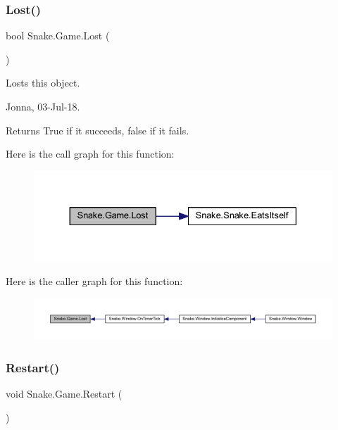 \subsubsection{\texorpdfstring{Lost()}{Lost()}}
{\footnotesize\ttfamily bool Snake.\+Game.\+Lost (\begin{DoxyParamCaption}{ }\end{DoxyParamCaption})}



Losts this object. 

Jonna, 03-\/\+Jul-\/18. 

\begin{DoxyReturn}{Returns}
True if it succeeds, false if it fails. 
\end{DoxyReturn}
Here is the call graph for this function\+:
\nopagebreak
\begin{figure}[H]
\begin{center}
\leavevmode
\includegraphics[width=330pt]{d5/d72/class_snake_1_1_game_ae1c3c7687934689be99f9894c609b5cb_cgraph}
\end{center}
\end{figure}
Here is the caller graph for this function\+:
\nopagebreak
\begin{figure}[H]
\begin{center}
\leavevmode
\includegraphics[width=350pt]{d5/d72/class_snake_1_1_game_ae1c3c7687934689be99f9894c609b5cb_icgraph}
\end{center}
\end{figure}
\mbox{\label{class_snake_1_1_game_ae3bcefb730cb41ecfc315da121687315}} 
\subsubsection{\texorpdfstring{Restart()}{Restart()}}
{\footnotesize\ttfamily void Snake.\+Game.\+Restart (\begin{DoxyParamCaption}{ }\end{DoxyParamCaption})}



